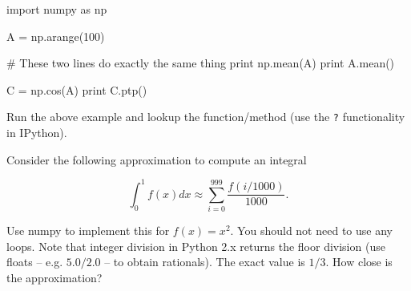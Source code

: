 \begin{python}
import numpy as np

A = np.arange(100)

# These two lines do exactly the same thing
print np.mean(A)
print A.mean()

C = np.cos(A)
print C.ptp()
\end{python}

\begin{exercise}
Run the above example and lookup the  function/method (use the \texttt{?} functionality in IPython).
\end{exercise}


\begin{exercise}
Consider the following approximation to compute an integral

\[
\int_0^{1} f(x)dx \approx \sum_{i = 0}^{999} \frac{f(i/1000)}{1000}.
\]

Use numpy to implement this for $f(x) = x^2$. You should not need to use any loops. Note that integer division in Python 2.x returns the floor division (use floats -- e.g. $5.0/2.0$ -- to obtain rationals). The exact value is $1/3$. How close is the approximation?
\end{exercise}



